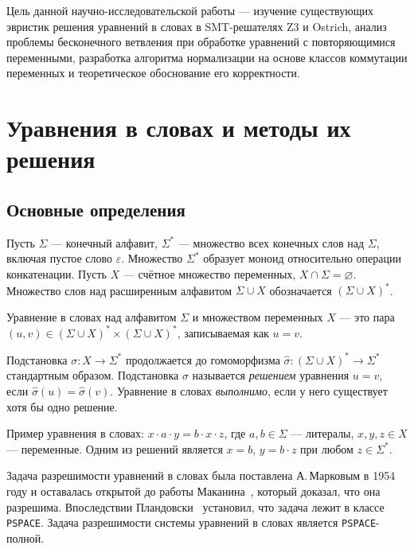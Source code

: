 \documentclass[14pt, russian]{scrartcl}
\begin{document}
Цель данной научно-исследовательской работы --- изучение существующих эвристик
решения уравнений в словах в SMT-решателях Z3 и Ostrich, анализ проблемы
бесконечного ветвления при обработке уравнений с повторяющимися переменными,
разработка алгоритма нормализации на основе классов коммутации переменных и
теоретическое обоснование его корректности.

\section{Уравнения в словах и методы их решения}

\subsection{Основные определения}

Пусть $\Sigma$ --- конечный алфавит, $\Sigma^*$ --- множество всех конечных слов над $\Sigma$,
включая пустое слово $\varepsilon$. Множество $\Sigma^*$ образует моноид относительно
операции конкатенации. Пусть $X$ --- счётное множество переменных, $X \cap \Sigma = \varnothing$.
Множество слов над расширенным алфавитом $\Sigma \cup X$ обозначается $(\Sigma \cup X)^*$.

\begin{Definition}
Уравнение в словах над алфавитом $\Sigma$ и множеством переменных $X$ --- это
пара $(u, v) \in (\Sigma \cup X)^* \times (\Sigma \cup X)^*$, записываемая как
$u = v$.
\end{Definition}

Подстановка $\sigma : X \to \Sigma^*$ продолжается до гомоморфизма
$\hat{\sigma} : (\Sigma \cup X)^* \to \Sigma^*$ стандартным образом. Подстановка $\sigma$
называется \emph{решением} уравнения $u = v$, если $\hat{\sigma}(u) = \hat{\sigma}(v)$.
Уравнение в словах \emph{выполнимо}, если у него существует хотя бы одно решение.

Пример уравнения в словах: $x \cdot a \cdot y = b \cdot x \cdot z$, где $a, b \in \Sigma$ ---
литералы, $x, y, z \in X$ --- переменные. Одним из решений является $x = b$, $y = b \cdot z$
при любом $z \in \Sigma^*$.

Задача разрешимости уравнений в словах была поставлена А.\,Марковым в 1954 году и
оставалась открытой до работы Маканина~\cite{makanin1977}, который доказал, что она
разрешима. Впоследствии Пландовски~\cite{plandowski2004} установил, что задача лежит
в классе \texttt{PSPACE}. Задача разрешимости системы уравнений в словах является
\texttt{PSPACE}-полной.
\end{document}
